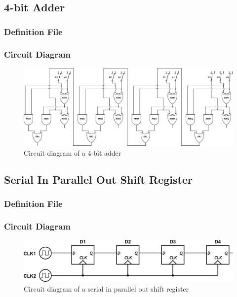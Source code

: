 \documentclass[a4paper,10pt]{article}
\begin{document}
\subsection{4-bit Adder}
\subsubsection{Definition File}

\subsubsection{Circuit Diagram}
\begin{figure}[h]
 \centering
 \includegraphics[width=16cm]{../../examples/4-bit-adder.png}
 \caption{Circuit diagram of a 4-bit adder}
 \label{fig:example-adder}
\end{figure}

\subsection{Serial In Parallel Out Shift Register}
\subsubsection{Definition File}

\subsubsection{Circuit Diagram}

\begin{figure}[h]
 \centering
 \includegraphics[width=12cm]{../../examples/sipo.png}
 \caption{Circuit diagram of a serial in parallel out shift register}
 \label{fig:example-sipo}
\end{figure}
\end{document}

